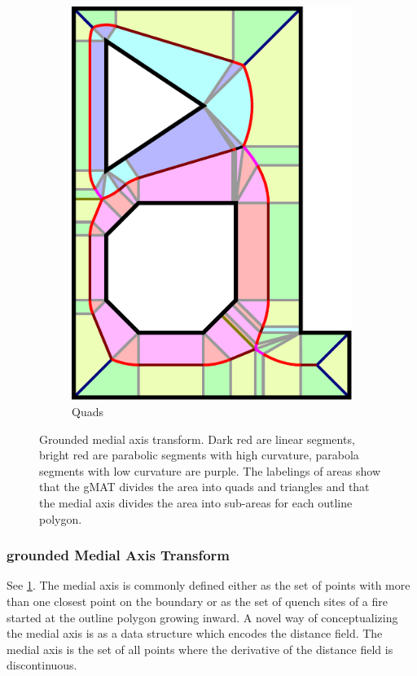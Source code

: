 \begin{figure}
\begin{subfigure}{0.24\columnwidth}
\includegraphics[width=\columnwidth]{sources/method/gMAT_example_labeling.pdf}
\caption{Quads}
\end{subfigure}
\caption{Grounded medial axis transform. Dark red are linear segments,  bright red are parabolic segments with high curvature, parabola segments with low curvature are purple. The labelings of areas show that the gMAT divides the area into quads and triangles and that the medial axis divides the area into sub-areas for each outline polygon.}
\label{gmat}
\end{figure}



\subsubsection{grounded Medial Axis Transform}
See \cref{gmat}.
The medial axis is commonly defined either as the set of points with more than one closest point on the boundary or as the set of quench sites of a fire started at the outline polygon growing inward.
A novel way of conceptualizing the medial axis is as a data structure which encodes the distance field.
The medial axis is the set of all points where the derivative of the distance field is discontinuous.

